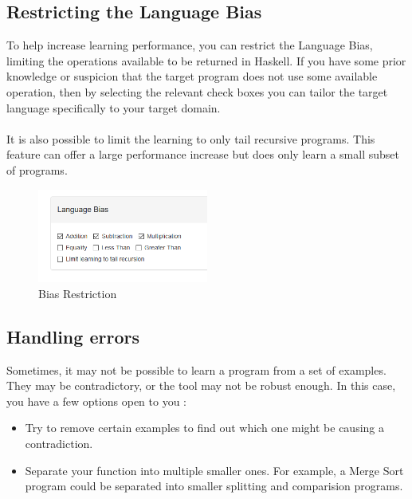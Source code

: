 \subsection{Restricting the Language Bias}
To help increase learning performance, you can restrict the Language Bias, limiting the operations available to be returned in Haskell. If you have some prior knowledge or suspicion that the target program does not use some available operation, then by selecting the relevant check boxes you can tailor the target language specifically to your target domain. \\ \\
It is also possible to limit the learning to only tail recursive programs. This feature can offer a large performance increase but does only learn a small subset of programs.

\begin{figure}[h!]
\centering
\includegraphics[width=0.5\textwidth]{C5/bias_restriction.png}
\caption{Bias Restriction}
\end{figure}

\subsection{Handling errors}

Sometimes, it may not be possible to learn a program from a set of examples. They may be contradictory, or the tool may not be robust enough. In this case, you have a few options open to you :

\begin{itemize}
\item Try to remove certain examples to find out which one might be causing a contradiction.
\item Separate your function into multiple smaller ones. For example, a Merge Sort program could be separated into smaller splitting and comparision programs.
\end{itemize}

\pagebreak

